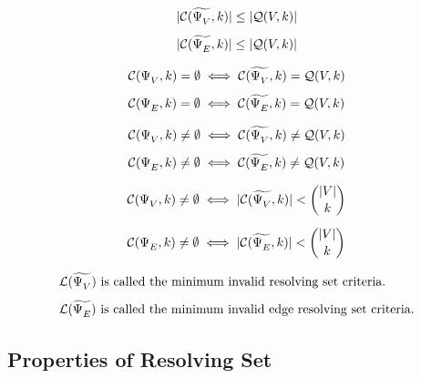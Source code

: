\begin{corollary}
	\[\begin{array}{c}
		|\mathcal{C}(\widetilde{\Psi^{}_{V}},k)| \leq |\mathcal{Q}(V,k)| \\ [8pt]
		|\mathcal{C}(\widetilde{\Psi^{}_{E}},k)| \leq |\mathcal{Q}(V,k)|
	\end{array}\]
\end{corollary}

\begin{lemma}
	\[\begin{array}{l}
		\mathcal{C}(\Psi^{}_{V},k) = \emptyset \iff \mathcal{C}(\widetilde{\Psi^{}_{V}},k) = \mathcal{Q}(V,k) \\ [8pt]
		\mathcal{C}(\Psi^{}_{E},k) = \emptyset \iff \mathcal{C}(\widetilde{\Psi^{}_{E}},k) = \mathcal{Q}(V,k)
	\end{array}\]
\end{lemma}

\begin{corollary}
	\[\begin{array}{l}
		\mathcal{C}(\Psi^{}_{V},k) \neq \emptyset \iff \mathcal{C}(\widetilde{\Psi^{}_{V}},k) \neq \mathcal{Q}(V,k) \\ [8pt]
		\mathcal{C}(\Psi^{}_{E},k) \neq \emptyset \iff \mathcal{C}(\widetilde{\Psi^{}_{E}},k) \neq \mathcal{Q}(V,k)
	\end{array}\]
\end{corollary}

\begin{corollary}
	\[\begin{array}{l}
		\mathcal{C}(\Psi^{}_{V},k) \neq \emptyset \iff |\mathcal{C}(\widetilde{\Psi^{}_{V}},k)| < \displaystyle \binom{|V|}{k} \\ [16pt]
		\mathcal{C}(\Psi^{}_{E},k) \neq \emptyset \iff |\mathcal{C}(\widetilde{\Psi^{}_{E}},k)| < \displaystyle \binom{|V|}{k}
	\end{array}\]
\end{corollary}

\begin{definition}
	\[\begin{array}{l}
		\mathcal{L}(\widetilde{\Psi^{}_{V}}) \text{ is called the minimum invalid resolving set criteria.} \\ [8pt]
		\mathcal{L}(\widetilde{\Psi^{}_{E}}) \text{ is called the minimum invalid edge resolving set criteria.}
	\end{array}\]
\end{definition}

\cleardoublepage
\subsection{Properties of Resolving Set}

